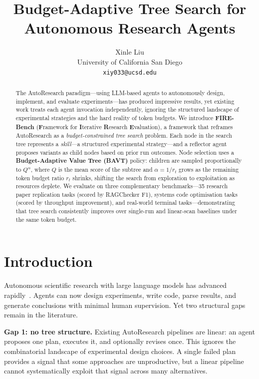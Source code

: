 \documentclass{article}
\title{Budget-Adaptive Tree Search for Autonomous Research Agents}
\author{%
  Xinle Liu \\
  University of California San Diego \\
  \texttt{xiy033@ucsd.edu} \\
}
\begin{document}
\maketitle

\begin{abstract}
The AutoResearch paradigm---using LLM-based agents to autonomously design, implement, and evaluate experiments---has produced impressive results, yet existing work treats each agent invocation independently, ignoring the structured landscape of experimental strategies and the hard reality of token budgets.
We introduce \textbf{FIRE-Bench} (\textbf{F}ramework for \textbf{I}terative \textbf{R}esearch \textbf{E}valuation), a framework that reframes AutoResearch as a \emph{budget-constrained tree search} problem.
Each node in the search tree represents a \emph{skill}---a structured experimental strategy---and a reflector agent proposes variants as child nodes based on prior run outcomes.
Node selection uses a \textbf{Budget-Adaptive Value Tree (BAVT)} policy: children are sampled proportionally to $Q^{\alpha}$, where $Q$ is the mean score of the subtree and $\alpha = 1/r_t$ grows as the remaining token budget ratio $r_t$ shrinks, shifting the search from exploration to exploitation as resources deplete.
We evaluate on three complementary benchmarks---35 research paper replication tasks (scored by RAGChecker F1), systems code optimisation tasks (scored by throughput improvement), and real-world terminal tasks---demonstrating that tree search consistently improves over single-run and linear-scan baselines under the same token budget.
\end{abstract}

\section{Introduction}
\label{sec:intro}

Autonomous scientific research with large language models has advanced rapidly~\cite{ai_scientist,autoresearch}.
Agents can now design experiments, write code, parse results, and generate conclusions with minimal human supervision.
Yet two structural gaps remain in the literature.

\textbf{Gap 1: no tree structure.}
Existing AutoResearch pipelines are linear: an agent proposes one plan, executes it, and optionally revises once.
This ignores the combinatorial landscape of experimental design choices.
A single failed plan provides a signal that some approaches are unproductive, but a linear pipeline cannot systematically exploit that signal across many alternatives.
\end{document}
